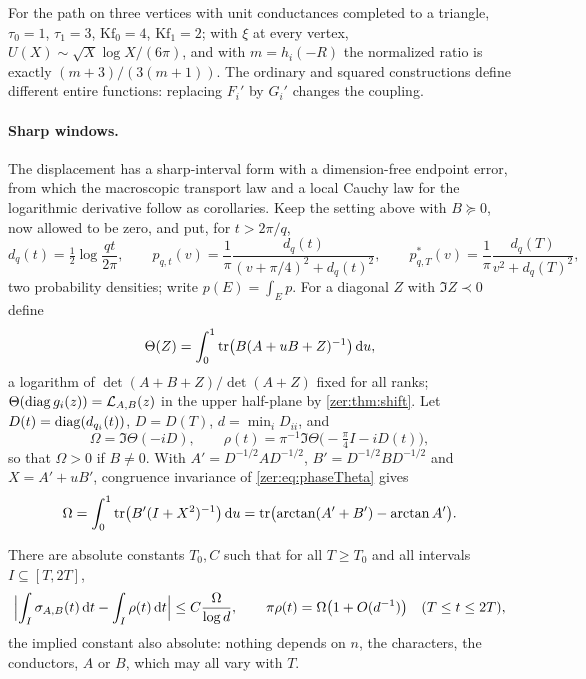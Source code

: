 For the path on three vertices with unit conductances completed to a triangle, $\tau_0=1$, $\tau_1=3$,
$\mathrm{Kf}_0=4$, $\mathrm{Kf}_1=2$; with $\xi$ at every vertex, $U(X)\sim\sqrt X\log X/(6\pi)$, and with
$m=h_i(-R)$ the normalized ratio is exactly $(m+3)/(3(m+1))$. The ordinary and squared constructions
define different entire functions: replacing $F_i'$ by $G_i'$ changes the coupling.

\paragraph{Sharp windows.}
The displacement has a sharp-interval form with a dimension-free endpoint error, from which the
macroscopic transport law and a local Cauchy law for the logarithmic derivative follow as
corollaries. Keep the setting above with $B\succeq0$, now allowed to be zero, and put, for $t>2\pi/q$,
\[
 d_q(t)=\tfrac12\log\frac{qt}{2\pi},\qquad p_{q,t}(v)=\frac1\pi\frac{d_q(t)}{(v+\pi/4)^2+d_q(t)^2},\qquad
 p^*_{q,T}(v)=\frac1\pi\frac{d_q(T)}{v^2+d_q(T)^2},
\]
two probability densities; write $p(E)=\int_Ep$. For a diagonal $Z$ with $\Im Z\prec0$ define
\begin{equation}\label{zer:eq:phaseTheta}
 \Theta(Z)=\int_0^1\operatorname{tr}\bigl(B(A+uB+Z)^{-1}\bigr)\,\mathrm{d} u,
\end{equation}
a logarithm of $\det(A+B+Z)/\det(A+Z)$ fixed for all ranks; $\Theta(\operatorname{diag} g_i(z))=\mathcal L_{A,B}(z)$ in the
upper half-plane by \cref{zer:thm:shift}. Let $D(t)=\operatorname{diag}(d_{q_i}(t))$, $D=D(T)$, $d=\min_iD_{ii}$, and
\[
 \Omega=\Im\Theta(-iD),\qquad \rho(t)=\pi^{-1}\Im\Theta\bigl(-\tfrac\pi4I-iD(t)\bigr),
\]
so that $\Omega>0$ if $B\ne0$. With $A'=D^{-1/2}AD^{-1/2}$, $B'=D^{-1/2}BD^{-1/2}$ and $X=A'+uB'$, congruence
invariance of \eqref{zer:eq:phaseTheta} gives
\begin{equation}\label{zer:eq:Omega}
 \Omega=\int_0^1\operatorname{tr}\bigl(B'(I+X^2)^{-1}\bigr)\,\mathrm{d} u=\operatorname{tr}\bigl(\arctan(A'+B')-\arctan A'\bigr).
\end{equation}

\begin{theorem}\label{zer:thm:sharpinterval}
There are absolute constants $T_0,C$ such that for all $T\ge T_0$ and all intervals $I\subseteq[T,2T]$,
\[
 \Bigl|\int_I\sigma_{A,B}(t)\,\mathrm{d} t-\int_I\rho(t)\,\mathrm{d} t\Bigr|\le C\frac\Omega{\log d},\qquad
 \pi\rho(t)=\Omega\bigl(1+O(d^{-1})\bigr)\quad(T\le t\le2T),
\]
the implied constant also absolute: nothing depends on $n$, the characters, the conductors, $A$ or $B$,
which may all vary with $T$.
\end{theorem}

